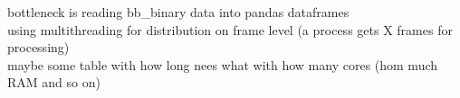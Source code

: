 bottleneck is reading bb\_binary data into pandas dataframes\\
using multithreading for distribution on frame level (a process gets X frames for processing)\\

maybe some table with how long nees what with how many cores (hom much RAM and so on)\\